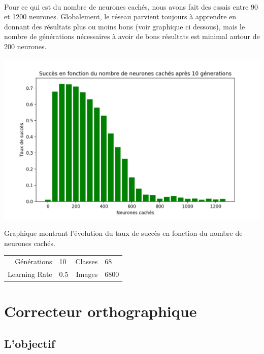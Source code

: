 \documentclass{article}
\begin{document}
\paragraph{}Pour ce qui est du nombre de neurones cachés, nous avons fait des essais entre 90 et 1200 neurones. Globalement, le réseau parvient toujours à apprendre en donnant des résultats plus ou moins bons (voir graphique ci dessous), mais le nombre de générations nécessaires à avoir de bons résultats est minimal autour de 200 neurones.

\begin{center}
	\includegraphics[scale=0.3]{hiddenNodesGraph.png}
	
	Graphique montrant l'évolution du taux de succès en fonction du nombre de neurones cachés.
	
	\begin{tabular}{r@{: }l r@{: }l}
		Générations & 10 & Classes & 68 \\
		Learning Rate & 0.5 & Images & 6800 \\
	\end{tabular}
	
\end{center}







\newpage
{}
\section{Correcteur orthographique}

\subsection{L'objectif}
\end{document}
